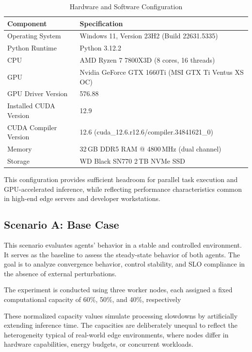 \begin{table}[H]
\centering
\caption{Hardware and Software Configuration}
\label{tab:hardware-software}
\begin{tabular}{@{}ll@{}}
\toprule
\textbf{Component} & \textbf{Specification} \\
\midrule
Operating System & Windows 11, Version 23H2 (Build 22631.5335) \\
Python Runtime & Python 3.12.2 \\
CPU & AMD Ryzen 7 7800X3D (8 cores, 16 threads) \\
GPU & Nvidia GeForce GTX 1660Ti (MSI GTX Ti Ventus XS OC) \\
GPU Driver Version & 576.88 \\
Installed CUDA Version & 12.9 \\
CUDA Compiler Version & 12.6 (cuda\_12.6.r12.6/compiler.34841621\_0) \\
Memory & 32\,GB DDR5 RAM @ 4800\,MHz (dual channel) \\
Storage & WD Black SN770 2\,TB NVMe SSD \\
\bottomrule
\end{tabular}
\end{table}


This configuration provides sufficient headroom for parallel task execution and GPU-accelerated inference, while reflecting performance characteristics common in high-end edge servers and developer workstations.

\subsection{Scenario A: Base Case}
\label{sec:evaluation-base}

This scenario evaluates agents' behavior in a stable and controlled environment. It serves as the baseline to assess the steady-state behavior of both agents. The goal is to analyze convergence behavior, control stability, and SLO compliance in the absence of external perturbations.

The experiment is conducted using three worker nodes, each assigned a fixed computational capacity of 60\%, 50\%, and 40\%, respectively

These normalized capacity values simulate processing slowdowns by artificially extending inference time. The capacities are deliberately unequal to reflect the heterogeneity typical of real-world edge environments, where nodes differ in hardware capabilities, energy budgets, or concurrent workloads.

